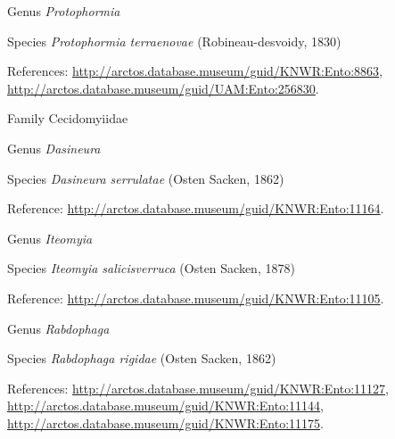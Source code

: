 \documentclass[9pt, article]{memoir}
\begin{document}
\begin{multicols}{2}
\vspace{6pt}\noindent\hspace{30pt}Genus \textit{Protophormia}


\vspace{6pt}\noindent\hspace{36pt}Species \textit{Protophormia terraenovae} (Robineau-desvoidy, 1830)


\vspace{6pt}References: 
\url{http://arctos.database.museum/guid/KNWR:Ento:8863}, 
\url{http://arctos.database.museum/guid/UAM:Ento:256830}.

\vspace{6pt}\noindent\hspace{24pt}Family Cecidomyiidae


\vspace{6pt}\noindent\hspace{30pt}Genus \textit{Dasineura}


\vspace{6pt}\noindent\hspace{36pt}Species \textit{Dasineura serrulatae} (Osten Sacken, 1862)


\vspace{6pt}Reference: 
\url{http://arctos.database.museum/guid/KNWR:Ento:11164}.

\vspace{6pt}\noindent\hspace{30pt}Genus \textit{Iteomyia}


\vspace{6pt}\noindent\hspace{36pt}Species \textit{Iteomyia salicisverruca} (Osten Sacken, 1878)


\vspace{6pt}Reference: 
\url{http://arctos.database.museum/guid/KNWR:Ento:11105}.

\vspace{6pt}\noindent\hspace{30pt}Genus \textit{Rabdophaga}


\vspace{6pt}\noindent\hspace{36pt}Species \textit{Rabdophaga rigidae} (Osten Sacken, 1862)


\vspace{6pt}References: 
\url{http://arctos.database.museum/guid/KNWR:Ento:11127}, 
\url{http://arctos.database.museum/guid/KNWR:Ento:11144}, 
\url{http://arctos.database.museum/guid/KNWR:Ento:11175}.


\end{multicols}
\end{document}

